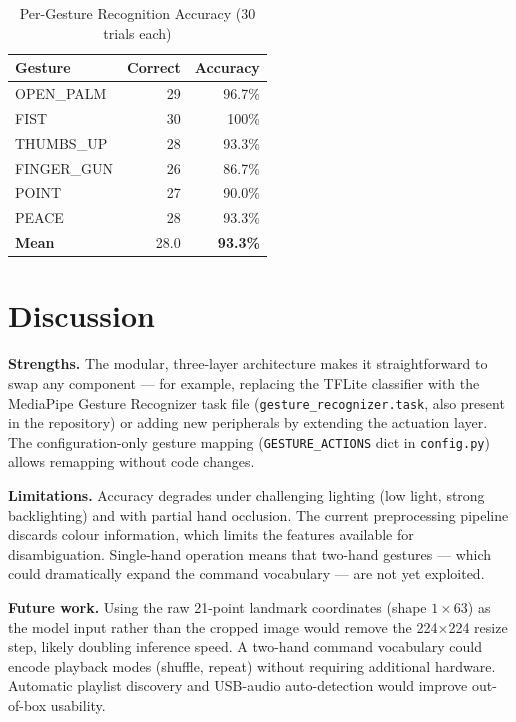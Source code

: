 \documentclass[sigconf, nonacm]{acmart}
\begin{document}
\begin{table}[h]
\centering
\caption{Per-Gesture Recognition Accuracy (30 trials each)}
\label{tab:accuracy}
\begin{tabular}{lrr}
\toprule
\textbf{Gesture}  & \textbf{Correct} & \textbf{Accuracy} \\
\midrule
OPEN\_PALM  & 29 & 96.7\% \\
FIST        & 30 & 100\%  \\
THUMBS\_UP  & 28 & 93.3\% \\
FINGER\_GUN & 26 & 86.7\% \\
POINT       & 27 & 90.0\% \\
PEACE       & 28 & 93.3\% \\
\midrule
\textbf{Mean} & 28.0 & \textbf{93.3\%} \\
\bottomrule
\end{tabular}
\end{table}

\section{Discussion}

\textbf{Strengths.} The modular, three-layer architecture makes it straightforward to swap any component — for example, replacing the TFLite classifier with the MediaPipe Gesture Recognizer task file (\texttt{gesture\_recognizer.task}, also present in the repository) or adding new peripherals by extending the actuation layer. The configuration-only gesture mapping (\texttt{GESTURE\_ACTIONS} dict in \texttt{config.py}) allows remapping without code changes.

\textbf{Limitations.} Accuracy degrades under challenging lighting (low light, strong backlighting) and with partial hand occlusion. The current preprocessing pipeline discards colour information, which limits the features available for disambiguation. Single-hand operation means that two-hand gestures — which could dramatically expand the command vocabulary — are not yet exploited.

\textbf{Future work.} Using the raw 21-point landmark coordinates (shape $1 \times 63$) as the model input rather than the cropped image would remove the 224$\times$224 resize step, likely doubling inference speed. A two-hand command vocabulary could encode playback modes (shuffle, repeat) without requiring additional hardware. Automatic playlist discovery and USB-audio auto-detection would improve out-of-box usability.
\end{document}
